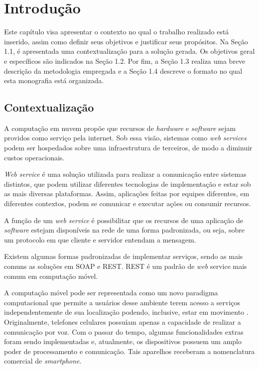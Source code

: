 \chapter{Introdução} \label{CHP:TEO}%
	Este capítulo visa apresentar o contexto no qual o trabalho realizado está inserido, assim como definir seus objetivos e justificar seus propósitos. Na Seção 1.1, é apresentada uma contextualização para a solução gerada. Os objetivos geral e específicos são indicados na Seção 1.2. Por fim, a Seção 1.3 realiza uma breve descrição da metodologia empregada e a Seção 1.4 descreve o formato no qual esta monografia está organizada.
 
\section{Contextualização}
 
        A computação em nuvem propõe que recursos de \emph{hardware} e \emph{software} sejam providos como serviço pela internet. Sob essa visão, sistemas como \emph{web services} podem ser hospedados sobre uma infraestrutura de terceiros, de modo a diminuir custos operacionais.

		\emph{Web service} é uma solução utilizada para realizar a comunicação entre sistemas distintos, que podem utilizar diferentes tecnologias de implementação e estar sob as mais diversas plataformas.  Assim, aplicações feitas por equipes diferentes, em diferentes contextos, podem se comunicar e executar ações ou consumir recursos.
		
		
        A função de um \emph{web service} é possibilitar que os recursos de uma aplicação de \emph{software} estejam disponíveis na rede de uma forma padronizada, ou seja, sobre um protocolo em que cliente e servidor entendam a mensagem.
        
		Existem algumas formas padronizadas de implementar serviços, sendo as mais comuns as soluções em \ac{SOAP} e \ac{REST}. \ac{REST} é um padrão de \emph{web} service mais comum em computação móvel.
		
        A computação móvel pode ser representada como um novo paradigma computacional que permite a usuários desse ambiente terem acesso a serviços independentemente de sua localização podendo, inclusive, estar em movimento \cite {fucapi}. Originalmente, telefones celulares possuíam apenas a capacidade de realizar a comunicação por voz. Com o passar do tempo, algumas funcionalidades extras foram sendo implementadas e, atualmente, os dispositivos possuem um amplo poder de processamento e comunicação. Tais aparelhos receberam a nomenclatura comercial de \emph{smartphone}.
		
